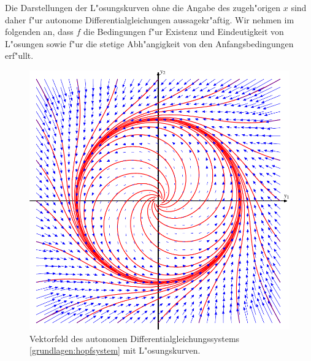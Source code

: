 Die Darstellungen der L"osungskurven ohne die Angabe des
zugeh"origen $x$ sind daher f"ur autonome Differentialgleichungen
 aussagekr"aftig.
Wir nehmen im folgenden an, dass $f$ die Bedingungen f"ur Existenz
und Eindeutigkeit von L"osungen sowie f"ur die stetige Abh"angigkeit
von den Anfangsbedingungen erf"ullt.

\begin{figure}
\centering
\includegraphics{chapters/images/grundlagen-2.pdf}
\caption{Vektorfeld des autonomen Differentialgleichungssystems
\eqref{grundlagen:hopfsystem}
mit L"osungskurven.
\label{grundlagen:vektorfeld}}
\end{figure}%

